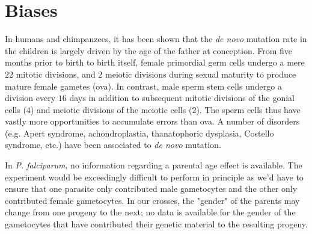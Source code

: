\section{Biases}

In humans and chimpanzees, it has been shown that the \textit{de novo} mutation rate in the children is largely driven by the age of the father at conception\cite{Kong:2012ek,Venn:2014ep}.  From five months prior to birth to birth itself, female primordial germ cells undergo a mere $22$ mitotic divisions, and $2$ meiotic divisions during sexual maturity\cite{Crow:2000gn} to produce mature female gametes (ova).  In contrast, male sperm stem cells undergo a division every $16$ days in addition to subsequent mitotic divisions of the gonial cells ($4$) and meiotic divisions of the meiotic cells ($2$).  The sperm cells thus have vastly more opportunities to accumulate errors than ova.  A number of disorders (e.g. Apert syndrome, achondroplastia, thanatophoric dysplasia, Costello syndrome, etc.) have been associated to \textit{de novo} mutation\cite{Glaser:2003da,Goriely:2012fi,Veltman:2012gw}.

In \textit{P. falciparum}, no information regarding a parental age effect is available.  The experiment would be exceedingly difficult to perform in principle as we'd have to ensure that one parasite only contributed male gametocytes and the other only contributed female gametocytes.  In our crosses, the "gender" of the parents may change from one progeny to the next; no data is available for the gender of the gametocytes that have contributed their genetic material to the resulting progeny.
